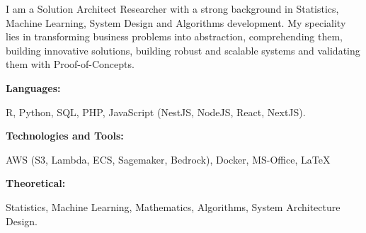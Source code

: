 \documentclass[9pt]{developercv} %
\begin{document}
\begin{minipage}[t]{0.46\textwidth}
	\vspace{-6pt}
 
	I am a Solution Architect Researcher with a strong background in Statistics, Machine Learning, System Design and Algorithms development. My speciality lies in transforming business problems into abstraction, comprehending them, building innovative solutions, building robust and scalable systems and validating them with Proof-of-Concepts. \\
\end{minipage}
\hfill %
\begin{minipage}[t]{0.46\textwidth}
    \vspace{-6pt}
    
    \begin{minipage}[t]{0.2\textwidth}
        \textbf{Languages:}
    \end{minipage}
    \hfill
    \begin{minipage}[t]{0.73\textwidth}
        R, Python, SQL, PHP, JavaScript (NestJS, NodeJS, React, NextJS). 
    \end{minipage}
    \vspace{4mm}
    
    \begin{minipage}[t]{0.25\textwidth}
        \textbf{Technologies and Tools:}
    \end{minipage}
    \hfill
    \begin{minipage}[t]{0.7\textwidth}
       AWS (S3, Lambda, ECS, Sagemaker, Bedrock), Docker, MS-Office, \LaTeX
    \end{minipage}
    \vspace{4mm}

    \begin{minipage}[t]{0.2\textwidth}
        \textbf{Theoretical:}
    \end{minipage}
    \hfill
    \begin{minipage}[t]{0.75\textwidth}
       Statistics, Machine Learning, Mathematics, Algorithms, System Architecture Design.
    \end{minipage}
    
\end{minipage}
\end{document}
